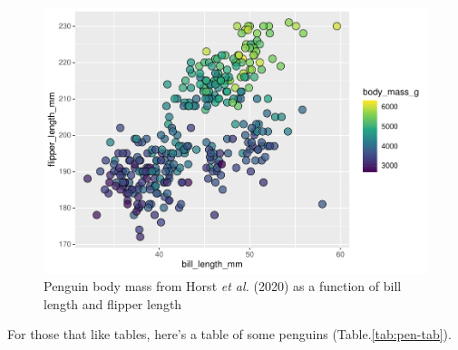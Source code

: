 \documentclass[
]{article}
\begin{document}
\begin{figure}
\centering
\includegraphics{my-pub_files/figure-latex/weight-plot-2-1.pdf}
\caption{\label{fig:weight-plot-2}Penguin body mass from Horst \emph{et al.} (2020) as a function of bill length and flipper length}
\end{figure}

For those that like tables, here's a table of some penguins (Table.\ref{tab:pen-tab}).
\end{document}
